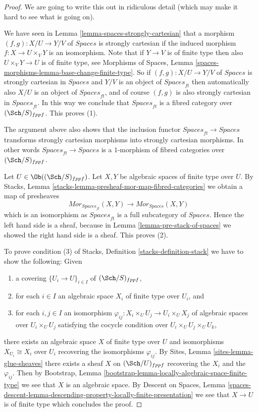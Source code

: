 \begin{proof}
We are going to write this out in ridiculous detail (which may make
it hard to see what is going on).

\medskip\noindent
We have seen in
Lemma \ref{lemma-spaces-strongly-cartesian}
that a morphism $(f, g) : X/U \to Y/V$ of $\textit{Spaces}$ is
strongly cartesian if the induced morphism $f : X \to U \times_V Y$
is an isomorphism. Note that if $Y \to V$ is of finite type
then also $U \times_V Y \to U$ is of finite type, see
Morphisms of Spaces,
Lemma \ref{spaces-morphisms-lemma-base-change-finite-type}.
So if $(f, g) : X/U \to Y/V$ of $\textit{Spaces}$ is
strongly cartesian in $\textit{Spaces}$ and $Y/V$ is an object
of $\textit{Spaces}_{ft}$ then automatically also $X/U$ is an
object of $\textit{Spaces}_{ft}$, and of course $(f, g)$ is
also strongly cartesian in $\textit{Spaces}_{ft}$. In this way
we conclude that $\textit{Spaces}_{ft}$ is a fibred category over
$(\Sch/S)_{fppf}$. This proves (1).

\medskip\noindent
The argument above also shows that the inclusion
functor $\textit{Spaces}_{ft} \to \textit{Spaces}$ transforms
strongly cartesian morphisms into strongly cartesian morphisms.
In other words $\textit{Spaces}_{ft} \to \textit{Spaces}$ is
a $1$-morphism of fibred categories over $(\Sch/S)_{fppf}$.

\medskip\noindent
Let $U \in \Ob((\Sch/S)_{fppf})$.
Let $X, Y$ be algebraic spaces of finite type over $U$. By
Stacks, Lemma \ref{stacks-lemma-presheaf-mor-map-fibred-categories}
we obtain a map of presheaves
$$
\mathit{Mor}_{\textit{Spaces}_{ft}}(X, Y)
\longrightarrow
\mathit{Mor}_{\textit{Spaces}}(X, Y)
$$
which is an isomorphism as $\textit{Spaces}_{ft}$ is a full subcategory of
$\textit{Spaces}$. Hence the left hand side is a sheaf, because in
Lemma \ref{lemma-pre-stack-of-spaces}
we showed the right hand side is a sheaf. This proves (2).

\medskip\noindent
To prove condition (3) of
Stacks, Definition \ref{stacks-definition-stack}
we have to show the following: Given
\begin{enumerate}
\item a covering $\{U_i \to U\}_{i \in I}$ of $(\Sch/S)_{fppf}$,
\item for each $i \in I$ an algebraic space $X_i$ of finite type over $U_i$,
and
\item for each $i, j \in I$ an isomorphism
$\varphi_{ij} : X_i \times_U U_j \to U_i \times_U X_j$ of algebraic spaces
over $U_i \times_U U_j$ satisfying the cocycle condition over
$U_i \times_U U_j \times_U U_k$,
\end{enumerate}
there exists an algebraic space $X$ of finite type over $U$ and isomorphisms
$X_{U_i} \cong X_i$ over $U_i$ recovering the isomorphisms $\varphi_{ij}$. By
Sites, Lemma \ref{sites-lemma-glue-sheaves}
there exists a sheaf $X$ on $(\Sch/U)_{fppf}$ recovering
the $X_i$ and the $\varphi_{ij}$. Then by
Bootstrap, Lemma \ref{bootstrap-lemma-locally-algebraic-space-finite-type}
we see that $X$ is an algebraic space. By
Descent on Spaces, Lemma
\ref{spaces-descent-lemma-descending-property-locally-finite-presentation}
we see that $X \to U$ is of finite type which concludes the proof.
\end{proof}

